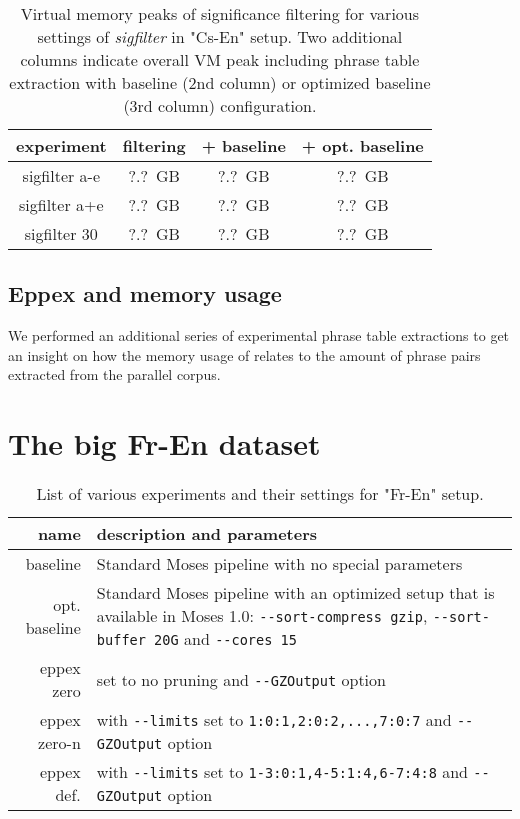 \begin{table}[ht]
\centering
\begin{tabular}{ | c | c | c | c | }
\hline
experiment & filtering & + baseline & + opt. baseline \\
\hline
\hline
sigfilter a-e & ?.?~GB & ?.?~GB & ?.?~GB \\
sigfilter a+e & ?.?~GB & ?.?~GB & ?.?~GB \\
sigfilter 30  & ?.?~GB & ?.?~GB & ?.?~GB \\
\hline
\end{tabular}
\caption{\label{cs-en-wmt13-sigfilter-vm-peak-benchmarks}Virtual memory peaks
of significance filtering for various settings of \emph{sigfilter} in "Cs-En" setup.
Two additional columns indicate overall VM peak including phrase table extraction
with baseline (2nd column) or optimized baseline (3rd column) configuration.}
\end{table}

\subsection{Eppex and memory usage}


We performed an additional series of experimental phrase table extractions
to get an insight on how the memory usage of \eppex{} relates to the amount of
phrase pairs extracted from the parallel corpus.

\section{The big Fr-En dataset}

\begin{table}[ht]
\centering
\begin{tabular}{ r p{10cm} }
name & description and parameters \\
\hline
\hline
baseline      & Standard Moses pipeline with no special parameters \\
opt. baseline & Standard Moses pipeline with an optimized setup that is available in Moses 1.0:
\verb|--sort-compress gzip|, \verb|--sort-buffer 20G| and \verb|--cores 15| \\
eppex zero    & \eppex{} set to no pruning and \verb|--GZOutput| option \\
eppex zero-n  & \eppex{} with \verb|--limits| set to \verb|1:0:1,2:0:2,...,7:0:7| and \verb|--GZOutput| option \\
eppex def.    & \eppex{} with \verb|--limits| set to \verb|1-3:0:1,4-5:1:4,6-7:4:8| and \verb|--GZOutput| option \\
\hline
\hline
\end{tabular}
\caption{\label{fr-en-80-scenarios}List of various experiments and their
settings for "Fr-En" setup.}
\end{table}


